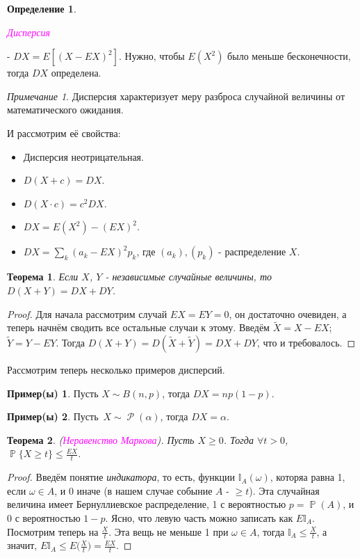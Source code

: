 \documentclass[a4paper,100pt]{article}
\theoremstyle{indented}
\newtheorem{theorem}{Теорема}
\theoremstyle{definition}
\newtheorem{defn}{Определение}
\newtheorem{exl}{Пример(ы)}
\theoremstyle{remark}
\newtheorem{remark}{Примечание}
\DeclareMathOperator{\PP}{\mathbb{P}}
\DeclareMathOperator{\Rho}{\mathcal{P}}
\begin{document}
\begin{defn}
  \hypertarget{n14}{\textcolor{magenta}{\textit{Дисперсия}}} - $DX = E[(X-EX)^2]$. Нужно, чтобы $E(X^2)$ было меньше бесконечности, тогда $DX$ определена.
\end{defn}

\begin{remark}
  Дисперсия характеризует меру разброса случайной величины от математического ожидания.
\end{remark}

И рассмотрим её свойства:

\begin{itemize}
  \item Дисперсия неотрицательная.
  \item $D(X+c)=DX$.
  \item $D(X\cdot c)=c^2 DX$.
  \item $DX = E(X^2) - (EX)^2$.
  \item $DX=\sum_k(a_k- EX)^2p_k$, где $(a_k), (p_k)$ - распределение $X$. 
\end{itemize}

\begin{theorem}
  Если $X$, $Y$ - независимые случайные величины, то $D(X+Y)=DX+DY$. 
\end{theorem}

\begin{proof}
  Для начала рассмотрим случай $EX=EY=0$, он достаточно очевиден, а теперь начнём сводить все остальные случаи к этому. Введём $\tilde{X}=X-EX$; $\tilde{Y}=Y-EY$. Тогда $D(X+Y)=D(\tilde{X}+\tilde{Y})=DX+DY$, что и требовалось.
\end{proof}

Рассмотрим теперь несколько примеров дисперсий.

\begin{exl}
  Пусть $X\sim B(n, p)$, тогда $DX=np(1-p)$. 
\end{exl}

\begin{exl}
  Пусть $X\sim \Rho(\alpha)$, тогда $DX = \alpha$. 
\end{exl}

\begin{theorem}  
  (\hypertarget{n15}{\textcolor{magenta}{\textit{Неравенство Маркова}}}). Пусть $X\geq 0$. Тогда $\forall t>0$, $\PP\{X \geq t\}\leq \frac{EX}{t}$.
\end{theorem}

\begin{proof}
  Введём понятие \textit{индикатора}, то есть, функции $\mathbb{I}_A(\omega)$, которяа равна 1, если $\omega \in A$, и 0 иначе (в нашем случае собыние $A$ - $\geq t$). Эта случайная величина имеет Бернуллиевское распределение, 1 с вероятностью $p=\PP(A)$, и 0 с вероятностью $1-p$. Ясно, что левую часть можно записать как $E\mathbb{I}_A$. Посмотрим теперь на $\frac{X}{t}$. Эта вещь не меньше 1 при $\omega \in A$, тогда $\mathbb{I}_A\leq \frac{X}{t}$, а значит, $E \mathbb{I}_A\leq E\biggl(\frac{X}{t}\biggr)=\frac{EX}{t}$. 
\end{proof}
\end{document}
